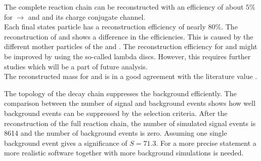 The complete reaction chain can be reconstructed with an efficiency of about $5\%$ for \pbarp $\rightarrow$ \excitedcascade and \anticascade and its
charge conjugate channel.\\
Each final states particle has a reconstruction efficiency of nearly $80\%$.
The reconstruction of \lam and \alam shows a difference in the efficiencies.
This is caused by the different mother particles of the \lam and \alam. 
The reconstruction efficiency for \lam and \alam might be improved by using the so-called lambda discs.
However, this requires further studies which will be a part of future analysis.\\
The reconstructed mass for \excitedcascade and \excitedanticascade is in a good agreement with the literature value \cite{PDG}.

The topology of the decay chain suppresses the background efficiently.
The comparison between the number of signal and background events shows how well background events can be suppressed by the selection criteria.
After the reconstruction of the full reaction chain, the number of simulated signal events is 8614 and the number of background events is zero. 
Assuming one single background event gives a significance of $S=71.3$.
For a more precise statement a more realistic software together with more background simulations is needed. 

 
  


